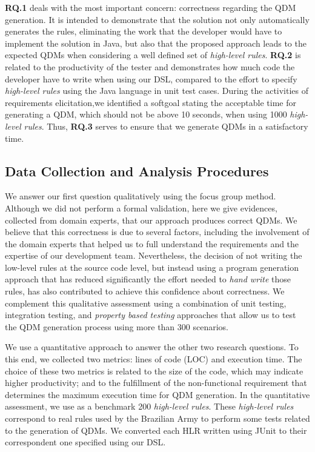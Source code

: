 \documentclass[twocolumn]{bmcart}%
\newcommand{\callers}{\emph{high-level rules}\xspace}
\newcommand{\shc}{HLR\xspace}
\begin{document}
\textbf{RQ.1} deals with the most important concern: correctness regarding the QDM generation. It is intended to demonstrate that the solution not only automatically generates the rules, eliminating the work that the developer would have to implement the solution in Java, but also that the proposed approach leads to the expected QDMs when considering a well defined set of \callers. \textbf{RQ.2} is related to the productivity of the tester and demonstrates how much code the developer have to write when using our DSL, compared to the effort to specify \callers using the Java language in unit test cases. During the activities of requirements elicitation,we identified a softgoal stating the  acceptable time for generating a QDM, which should not be above 10 seconds, when using 1000 \callers. Thus, \textbf{RQ.3} serves to ensure that we generate QDMs in a satisfactory time.



\subsection{Data Collection and Analysis Procedures}

We answer our first question qualitatively using the focus group method. Although
we did not perform a formal validation, here we give evidences, collected from domain experts, that our approach produces correct QDMs. We believe that this correctness is due to several factors, including the involvement of the domain experts that helped us to full understand the requirements and the expertise of our development team. Nevertheless, the decision of not writing the low-level rules at the source code level, but instead using a program generation approach that has reduced significantly the effort needed to \emph{hand write} those rules, has also contributed to achieve this confidence about correctness. We complement this qualitative
assessment using a combination of unit testing, integration testing, and
\emph{property based testing} approaches that allow us to
test the QDM generation process using more than 300 scenarios. 

We use a quantitative approach to answer the other two research questions.
To this end, we collected two metrics: lines of code (LOC) and execution time. The choice of these two metrics is related to the size of the code, which may indicate higher productivity; and to the fulfillment of the non-functional requirement that determines the maximum execution time for QDM generation. In the quantitative assessment, we use as a benchmark 200 \callers. These \callers correspond to real rules used by the Brazilian Army to perform some tests related to the generation of QDMs. We converted each \shc written using JUnit to their correspondent one specified using our DSL.
\end{document}
